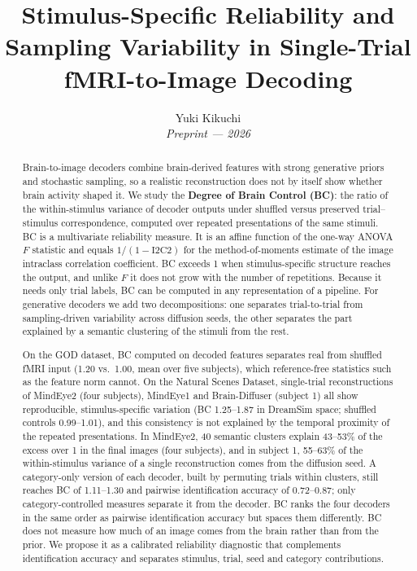 \documentclass[11pt,a4paper]{article}
\title{%
  \textbf{Stimulus-Specific Reliability and}\\
  \textbf{Sampling Variability in Single-Trial}\\
  \textbf{fMRI-to-Image Decoding}
}
\author{
  Yuki Kikuchi\\[0.4em]
  \small\textit{Preprint — 2026}
}
\date{}
\begin{document}
\maketitle
\thispagestyle{empty}

\begin{abstract}
Brain-to-image decoders combine brain-derived features with strong generative
priors and stochastic sampling, so a realistic reconstruction does not by itself
show whether brain activity shaped it. We study the \textbf{Degree of Brain
Control (BC)}: the ratio of the within-stimulus variance of decoder outputs
under shuffled versus preserved trial--stimulus correspondence, computed over
repeated presentations of the same stimuli. BC is a multivariate reliability
measure. It is an affine function of the one-way ANOVA $F$ statistic and equals
$1/(1-\mathrm{I2C2})$ for the method-of-moments estimate of the image intraclass
correlation coefficient. BC exceeds 1 when stimulus-specific structure reaches
the output, and unlike $F$ it does not grow with the number of repetitions.
Because it needs only trial labels, BC can be computed in any representation of
a pipeline. For generative decoders we add two decompositions: one separates
trial-to-trial from sampling-driven variability across diffusion seeds, the
other separates the part explained by a semantic clustering of the stimuli from
the rest.

On the GOD dataset, BC computed on decoded features separates real from
shuffled fMRI input (1.20 vs.\ 1.00, mean over five subjects), which
reference-free statistics such as the feature norm cannot. On the Natural
Scenes Dataset, single-trial reconstructions of MindEye2 (four subjects),
MindEye1 and Brain-Diffuser (subject 1) all show reproducible,
stimulus-specific variation (BC 1.25--1.87 in DreamSim space; shuffled controls
0.99--1.01), and this consistency is not explained by the temporal proximity
of the repeated presentations. In MindEye2, 40 semantic clusters explain
43--53\% of the excess over 1 in the final images (four subjects), and in
subject 1, 55--63\% of the within-stimulus variance of a single reconstruction
comes from the diffusion seed. A category-only version of each decoder, built
by permuting trials within clusters, still reaches BC of 1.11--1.30 and pairwise
identification accuracy of 0.72--0.87; only category-controlled measures
separate it from the decoder. BC ranks the
four decoders in the same order as pairwise identification accuracy but spaces
them differently. BC does not measure how much of an image comes from the brain
rather than from the prior. We propose it as a calibrated reliability
diagnostic that complements identification accuracy and separates stimulus,
trial, seed and category contributions.
\end{abstract}
\end{document}
